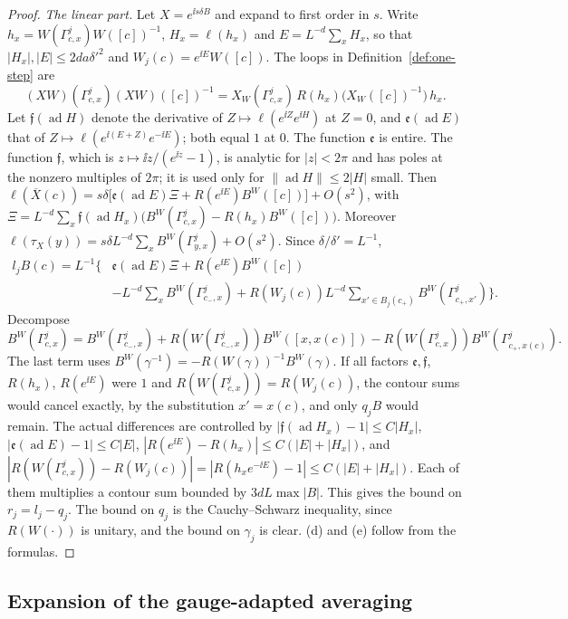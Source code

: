 \begin{proof}
\emph{The linear part.} Let $X=e^{\ii s\delta B}$ and expand to first order in $s$. Write $h_x=W(\Gamma^j_{c,x})W([c])^{-1}$, $H_x=\ell(h_x)$ and $E=L^{-d}\sum_xH_x$, so that $|H_x|,|E|\le2da\delta'^2$ and $W_j(c)=e^{\ii E}W([c])$. The loops in Definition~\ref{def:one-step} are
\[
(XW)(\Gamma^j_{c,x})(XW)([c])^{-1}=X_W(\Gamma^j_{c,x})\,R(h_x)\big(X_W([c])^{-1}\big)\,h_x .
\]
Let $\mathfrak f(\operatorname{ad}H)$ denote the derivative of $Z\mapsto\ell(e^{\ii Z}e^{\ii H})$ at $Z=0$, and $\mathfrak e(\operatorname{ad}E)$ that of $Z\mapsto\ell(e^{\ii(E+Z)}e^{-\ii E})$; both equal $1$ at $0$. The function $\mathfrak e$ is entire. The function $\mathfrak f$, which is $z\mapsto\ii z/(e^{\ii z}-1)$, is analytic for $|z|<2\pi$ and has poles at the nonzero multiples of $2\pi$; it is used only for $\|\operatorname{ad}H\|\le2|H|$ small. Then $\ell(\overline X(c))=s\delta\big[\mathfrak e(\operatorname{ad}E)\Xi+R(e^{\ii E})B^W([c])\big]+O(s^2)$, with $\Xi=L^{-d}\sum_x\mathfrak f(\operatorname{ad}H_x)\big(B^W(\Gamma^j_{c,x})-R(h_x)B^W([c])\big)$. Moreover $\ell(\tau_X(y))=s\delta L^{-d}\sum_xB^W(\Gamma^j_{y,x})+O(s^2)$. Since $\delta/\delta'=L^{-1}$,
\[
\begin{aligned}
l_jB(c)=L^{-1}\Big\{&\mathfrak e(\operatorname{ad}E)\Xi+R(e^{\ii E})B^W([c])\\
&-L^{-d}\sum_xB^W(\Gamma^j_{c_-,x})+R(W_j(c))L^{-d}\sum_{x'\in B_j(c_+)}B^W(\Gamma^j_{c_+,x'})\Big\}.
\end{aligned}
\]
Decompose
\[
B^W(\Gamma^j_{c,x})=B^W(\Gamma^j_{c_-,x})+R(W(\Gamma^j_{c_-,x}))B^W([x,x(c)])-R(W(\Gamma^j_{c,x}))B^W(\Gamma^j_{c_+,x(c)}).
\] The last term uses $B^W(\gamma^{-1})=-R(W(\gamma))^{-1}B^W(\gamma)$. If all factors $\mathfrak e,\mathfrak f$, $R(h_x)$, $R(e^{\ii E})$ were $1$ and $R(W(\Gamma^j_{c,x}))=R(W_j(c))$, the contour sums would cancel exactly, by the substitution $x'=x(c)$, and only $q_jB$ would remain. The actual differences are controlled by $|\mathfrak f(\operatorname{ad}H_x)-1|\le C|H_x|$, $|\mathfrak e(\operatorname{ad}E)-1|\le C|E|$, $|R(e^{\ii E})-R(h_x)|\le C(|E|+|H_x|)$, and $|R(W(\Gamma^j_{c,x}))-R(W_j(c))|=|R(h_xe^{-\ii E})-1|\le C(|E|+|H_x|)$. Each of them multiplies a contour sum bounded by $3dL\max|B|$. This gives the bound on $r_j=l_j-q_j$. The bound on $q_j$ is the Cauchy--Schwarz inequality, since $R(W(\cdot))$ is unitary, and the bound on $\gamma_j$ is clear. (d) and (e) follow from the formulas.
\end{proof}

\subsection{Expansion of the gauge-adapted averaging}

